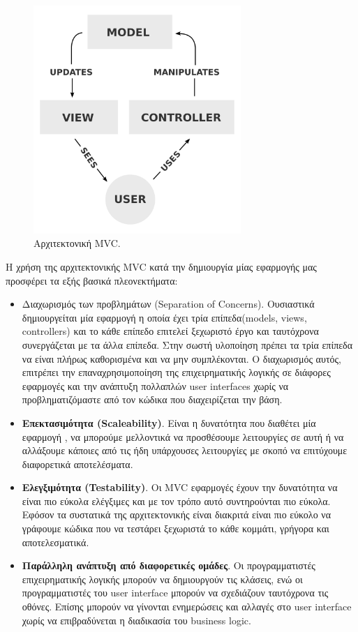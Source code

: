 	 \begin{figure}[h]
	    \centering
	    \includegraphics[width=0.7\textwidth]{mvcpattern.png}
	    \caption{Αρχιτεκτονική MVC.}
	    \label{fig:mvc_pattern}
	\end{figure}
		
		
		Η  χρήση της αρχιτεκτονικής MVC κατά την δημιουργία μίας εφαρμογής μας προσφέρει τα εξής βασικά πλεονεκτήματα:
		\begin{itemize}
		\item Διαχωρισμός των προβλημάτων (Separation of Concerns). Ουσιαστικά δημιουργείται μία εφαρμογή η οποία έχει τρία επίπεδα(models, views, controllers) και το κάθε επίπεδο επιτελεί ξεχωριστό έργο και ταυτόχρονα συνεργάζεται με τα άλλα επίπεδα. Στην σωστή υλοποίηση πρέπει τα τρία επίπεδα να είναι πλήρως καθορισμένα και να μην συμπλέκονται. Ο διαχωρισμός αυτός, επιτρέπει την επαναχρησιμοποίηση της επιχειρηματικής λογικής σε διάφορες εφαρμογές και την ανάπτυξη πολλαπλών user interfaces χωρίς να προβληματιζόμαστε από τον κώδικα που διαχειρίζεται την βάση.
		\item \textbf{Επεκτασιμότητα (Scaleability)}. Είναι η δυνατότητα που διαθέτει μία εφαρμογή , να μπορούμε μελλοντικά να προσθέσουμε λειτουργίες σε αυτή ή να αλλάξουμε κάποιες από τις ήδη υπάρχουσες λειτουργίες με σκοπό να επιτύχουμε διαφορετικά αποτελέσματα. 
		\item \textbf{Ελεγξιμότητα (Testability)}. Οι MVC εφαρμογές έχουν την δυνατότητα να είναι πιο εύκολα ελέγξιμες και με τον τρόπο αυτό συντηρούνται πιο εύκολα.  Εφόσον τα συστατικά της αρχιτεκτονικής είναι διακριτά είναι πιο εύκολο να γράφουμε κώδικα που να τεστάρει ξεχωριστά το κάθε κομμάτι, γρήγορα και αποτελεσματικά.
		\item \textbf{Παράλληλη ανάπτυξη από διαφορετικές ομάδες}. Οι προγραμματιστές επιχειρηματικής λογικής  μπορούν να δημιουργούν τις κλάσεις, ενώ οι προγραμματιστές του user interface μπορούν να σχεδιάζουν ταυτόχρονα τις οθόνες. Επίσης μπορούν να γίνονται ενημερώσεις και αλλαγές στο user interface χωρίς να επιβραδύνεται η διαδικασία του business logic.
		\end{itemize}
		
